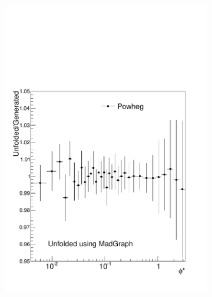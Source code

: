 \begin{figure}[!htbp]
    \centering
    \begin{subfigure}[b]{\SideBySidePlotWidth}
        \includegraphics[width=\textwidth]{figures/BinM_MP.pdf}
        \caption{}
        \label{fig:unfolding_powheg_with_madgraph}
    \end{subfigure}%
    \begin{subfigure}[b]{\SideBySidePlotWidth}

\end{subfigure}
\end{figure}
